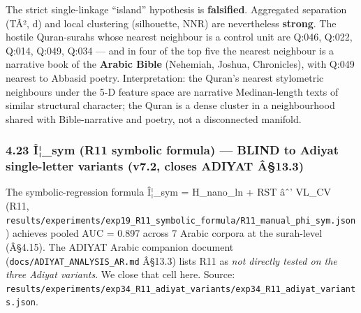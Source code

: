 \documentclass[
]{article}
\begin{document}
The strict single-linkage ``island'' hypothesis is \textbf{falsified}.
Aggregated separation (TÂ², d) and local clustering (silhouette, NNR)
are nevertheless \textbf{strong}. The hostile Quran-surahs whose nearest
neighbour is a control unit are Q:046, Q:022, Q:014, Q:049, Q:034 ---
and in four of the top five the nearest neighbour is a narrative book of
the \textbf{Arabic Bible} (Nehemiah, Joshua, Chronicles), with Q:049
nearest to Abbasid poetry. Interpretation: the Quran's nearest
stylometric neighbours under the 5-D feature space are narrative
Medinan-length texts of similar structural character; the Quran is a
dense cluster in a neighbourhood shared with Bible-narrative and poetry,
not a disconnected manifold.

\subsubsection{4.23 Î¦\_sym (R11 symbolic formula) --- BLIND to Adiyat
single-letter variants (v7.2, closes ADIYAT
Â§13.3)}\label{uxee_sym-r11-symbolic-formula-blind-to-adiyat-single-letter-variants-v7.2-closes-adiyat-uxe213.3}

The symbolic-regression formula Î¦\_sym = H\_nano\_ln + RST âˆ' VL\_CV
(R11,
\texttt{results/experiments/exp19\_R11\_symbolic\_formula/R11\_manual\_phi\_sym.json})
achieves pooled AUC = 0.897 across 7 Arabic corpora at the surah-level
(Â§4.15). The ADIYAT Arabic companion document
(\texttt{docs/ADIYAT\_ANALYSIS\_AR.md} Â§13.3) lists R11 as \emph{not
directly tested on the three Adiyat variants}. We close that cell here.
Source:
\texttt{results/experiments/exp34\_R11\_adiyat\_variants/exp34\_R11\_adiyat\_variants.json}.
\end{document}
